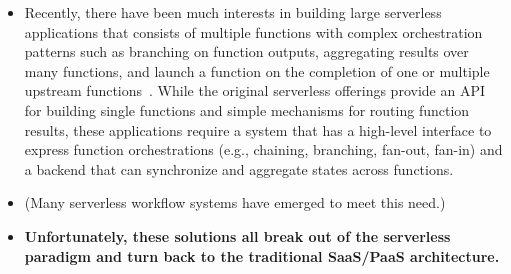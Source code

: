 \begin{itemize}
\begin{enumerate}
    \end{enumerate}

  \item Recently, there have been much interests in building large serverless
  applications that consists of multiple functions with complex orchestration
  patterns such as branching on function outputs, aggregating results over
  many functions, and launch a function on the completion of one or multiple
  upstream functions~\cite{excamera, kappa, pywren, google-workflows,
  durable-functions, gg-atc}. While the original serverless offerings provide
  an API for building single functions and simple mechanisms for routing
  function results, these applications require a system that has a high-level
  interface to express function orchestrations (e.g., chaining, branching,
  fan-out, fan-in) and a backend that can synchronize and aggregate states
  across functions.






  \item (Many serverless workflow systems have emerged to meet this need.)


  \item \textbf{Unfortunately, these solutions all break out of the serverless
  paradigm and turn back to the traditional SaaS/PaaS architecture.}


\end{itemize}
